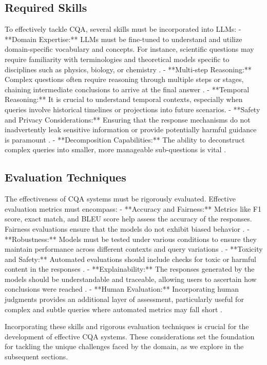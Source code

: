 \documentclass[12pt]{article}
\begin{document}
\subsection{Required Skills}
To effectively tackle CQA, several skills must be incorporated into LLMs:
- **Domain Expertise:** LLMs must be fine-tuned to understand and utilize domain-specific vocabulary and concepts. For instance, scientific questions may require familiarity with terminologies and theoretical models specific to disciplines such as physics, biology, or chemistry \cite{journalkasneci}.
- **Multi-step Reasoning:** Complex questions often require reasoning through multiple steps or stages, chaining intermediate conclusions to arrive at the final answer \cite{journaldasu}.
- **Temporal Reasoning:** It is crucial to understand temporal contexts, especially when queries involve historical timelines or projections into future scenarios.
- **Safety and Privacy Considerations:** Ensuring that the response mechanisms do not inadvertently leak sensitive information or provide potentially harmful guidance is paramount \cite{journalsekhar}. 
- **Decomposition Capabilities:** The ability to deconstruct complex queries into smaller, more manageable sub-questions is vital \cite{journalwang2022}.

\subsection{Evaluation Techniques}
The effectiveness of CQA systems must be rigorously evaluated. Effective evaluation metrics must encompass:
- **Accuracy and Fairness:** Metrics like F1 score, exact match, and BLEU score help assess the accuracy of the responses. Fairness evaluations ensure that the models do not exhibit biased behavior \cite{journalthakur}.
- **Robustness:** Models must be tested under various conditions to ensure they maintain performance across different contexts and query variations \cite{journalhuang2020}.
- **Toxicity and Safety:** Automated evaluations should include checks for toxic or harmful content in the responses \cite{journalgehman2020}.
- **Explainability:** The responses generated by the models should be understandable and traceable, allowing users to ascertain how conclusions were reached \cite{journaljacovi}.
- **Human Evaluation:** Incorporating human judgments provides an additional layer of assessment, particularly useful for complex and subtle queries where automated metrics may fall short \cite{journalgunning}.

Incorporating these skills and rigorous evaluation techniques is crucial for the development of effective CQA systems. These considerations set the foundation for tackling the unique challenges faced by the domain, as we explore in the subsequent sections.
\end{document}
